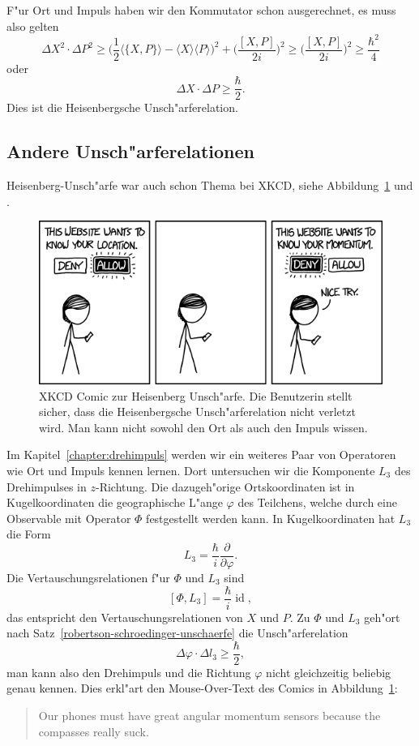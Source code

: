 F"ur Ort und Impuls haben wir den Kommutator schon ausgerechnet, es
muss also gelten
\begin{equation}
\Delta X^2\cdot \Delta P^2
\ge
\biggl(
\frac12\langle \{X,P\}\rangle - \langle X\rangle\langle P\rangle
\biggr)^2
+
\biggl(
\frac{[X,P]}{2i}
\biggr)^2
\ge
\biggl(
\frac{[X,P]}{2i}
\biggr)^2
\ge \frac{\hbar^2}4
\end{equation}
oder
\begin{equation}
\Delta X\cdot\Delta P\ge \frac{\hbar}2.
\end{equation}
Dies ist die Heisenbergsche Unsch"arferelation. 

\subsection{Andere Unsch"arferelationen}
Heisenberg-Unsch"arfe war auch schon Thema bei XKCD, siehe
Abbildung~\ref{heisenberg:xkcd} und \cite{skript:xkcd}.
\begin{figure}
\centering
\includegraphics[width=0.8\hsize]{images/xkcd-location-sharing.png}
\caption{XKCD Comic zur Heisenberg Unsch"arfe. Die Benutzerin stellt sicher,
dass die Heisenbergsche Unsch"arferelation nicht verletzt wird. Man kann nicht
sowohl den Ort als auch den Impuls wissen.
\label{heisenberg:xkcd}}
\end{figure}
Im Kapitel~\ref{chapter:drehimpuls} werden wir ein weiteres Paar
von Operatoren wie Ort und Impuls kennen lernen.
Dort untersuchen wir die Komponente $L_3$ des Drehimpulses in $z$-Richtung.
Die dazugeh"orige Ortskoordinaten ist in Kugelkoordinaten die geographische 
L"ange $\varphi$ des Teilchens, welche durch eine Observable mit Operator
$\Phi$ festgestellt werden kann.
In Kugelkoordinaten hat $L_3$ die Form
\[
L_3=\frac{\hbar}{i}\frac{\partial}{\partial\varphi}.
\]
Die Vertauschungsrelationen f"ur $\Phi$ und $L_3$ sind
\[
[\Phi,L_3]=\frac{\hbar}{i}\operatorname{id},
\]
das entspricht den Vertauschungsrelationen von $X$ und $P$.
Zu $\Phi$ und $L_3$ geh"ort nach Satz~\ref{robertson-schroedinger-unschaerfe}
die Unsch"arferelation
\[
\Delta\varphi\cdot\Delta l_3 \ge \frac{\hbar}2,
\]
man kann also den Drehimpuls und die Richtung $\varphi$ nicht gleichzeitig
beliebig genau kennen.
Dies erkl"art den Mouse-Over-Text des Comics in
Abbildung~\ref{heisenberg:xkcd}:
\begin{quote}
Our phones must have great angular momentum sensors because
the compasses really suck.
\end{quote}
